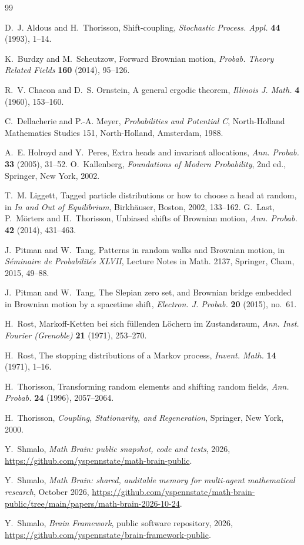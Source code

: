 \documentclass[11pt]{amsart}
\theoremstyle{remark}
\numberwithin{equation}{section}
\begin{document}
\begin{thebibliography}{99}

 D.~J. Aldous and H.~Thorisson, Shift-coupling, \emph{Stochastic Process. Appl.} \textbf{44} (1993), 1--14.

 K.~Burdzy and M.~Scheutzow, Forward Brownian motion, \emph{Probab. Theory Related Fields} \textbf{160} (2014), 95--126.

 R.~V. Chacon and D.~S. Ornstein, A general ergodic theorem, \emph{Illinois J. Math.} \textbf{4} (1960), 153--160.

 C.~Dellacherie and P.-A. Meyer, \emph{Probabilities and Potential C}, North-Holland Mathematics Studies 151, North-Holland, Amsterdam, 1988.

 A.~E. Holroyd and Y.~Peres, Extra heads and invariant allocations, \emph{Ann. Probab.} \textbf{33} (2005), 31--52.
 O.~Kallenberg, \emph{Foundations of Modern Probability}, 2nd ed., Springer, New York, 2002.

 T.~M. Liggett, Tagged particle distributions or how to choose a head at random, in \emph{In and Out of Equilibrium}, Birkh\"auser, Boston, 2002, 133--162.
 G.~Last, P.~M\"orters and H.~Thorisson, Unbiased shifts of Brownian motion, \emph{Ann. Probab.} \textbf{42} (2014), 431--463.

 J.~Pitman and W.~Tang, Patterns in random walks and Brownian motion, in \emph{S\'eminaire de Probabilit\'es XLVII}, Lecture Notes in Math. 2137, Springer, Cham, 2015, 49--88.

 J.~Pitman and W.~Tang, The Slepian zero set, and Brownian bridge embedded in Brownian motion by a spacetime shift, \emph{Electron. J. Probab.} \textbf{20} (2015), no.~61.

 H.~Rost, Markoff-Ketten bei sich f\"ullenden L\"ochern im Zustandsraum, \emph{Ann. Inst. Fourier (Grenoble)} \textbf{21} (1971), 253--270.

 H.~Rost, The stopping distributions of a Markov process, \emph{Invent. Math.} \textbf{14} (1971), 1--16.

 H.~Thorisson, Transforming random elements and shifting random fields, \emph{Ann. Probab.} \textbf{24} (1996), 2057--2064.

 H.~Thorisson, \emph{Coupling, Stationarity, and Regeneration}, Springer, New York, 2000.

 Y.~Shmalo, \emph{Math Brain: public snapshot, code and tests}, 2026, \url{https://github.com/yspennstate/math-brain-public}.

 Y.~Shmalo, \emph{Math Brain: shared, auditable memory for multi-agent mathematical research}, October 2026, \url{https://github.com/yspennstate/math-brain-public/tree/main/papers/math-brain-2026-10-24}.

 Y.~Shmalo, \emph{Brain Framework}, public software repository, 2026, \url{https://github.com/yspennstate/brain-framework-public}.

\end{thebibliography}
\end{document}
